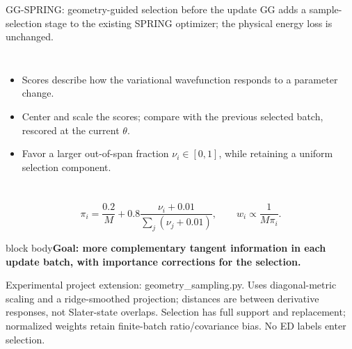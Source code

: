 \documentclass[aspectratio=169,10pt]{beamer}
\newcommand{\src}[1]{\vfill{\fontsize{6.3}{7.5}\selectfont\color{muted}#1\par}}
\newcommand{\take}[1]{\vspace{1mm}\begin{beamercolorbox}[sep=1.6mm,wd=\textwidth]{block body}\small\color{teal}\textbf{#1}\end{beamercolorbox}}
\begin{document}
\begin{frame}{GG-SPRING: geometry-guided selection before the update}
\small GG adds a sample-selection stage to the existing SPRING optimizer; the physical energy loss is unchanged.
\begin{center}\vspace{-1mm}
\end{center}
\begin{columns}[T,onlytextwidth]
\begin{itemize}\setlength\itemsep{4pt}
\item Scores describe how the variational wavefunction responds to a parameter change.
\item Center and scale the scores; compare with the previous selected batch, rescored at the current $\theta$.
\item Favor a larger out-of-span fraction $\nu_i\in[0,1]$, while retaining a uniform selection component.
\end{itemize}
\end{columns}
\[
\pi_i=\frac{0.2}{M}+0.8\frac{\nu_i+0.01}{\sum_j(\nu_j+0.01)},
\qquad w_i\propto\frac{1}{M\pi_i}.
\]
\take{Goal: more complementary tangent information in each update batch, with importance corrections for the selection.}
\src{Experimental project extension: geometry\_sampling.py. Uses diagonal-metric scaling and a ridge-smoothed projection; distances are between derivative responses, not Slater-state overlaps. Selection has full support and replacement; normalized weights retain finite-batch ratio/covariance bias. No ED labels enter selection.}
\end{frame}
\end{document}
